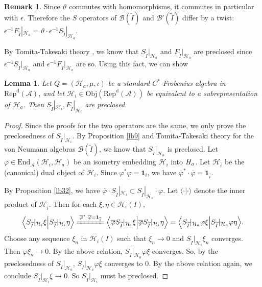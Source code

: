 \documentclass[12pt,a4paper]{article}
\theoremstyle{definition}
\newtheorem{rem}[df]{Remark}
\theoremstyle{plain}
\newtheorem{lm}[df]{Lemma}
\newcommand{\mc}{\mathcal}
\newcommand{\wtd}{\widetilde}
\newcommand{\ovl}{\overline}
\newcommand{\End}{\mathrm{End}} %
\newcommand{\id}{\mathbf{1}}
\newcommand{\bk}[1]{\langle {#1}\rangle}
\newcommand{\RepdA}{\mathrm{Rep}^{\mathrm d}(\mc A)}
\newcommand{\Obj}{\mathrm{Obj}}
\numberwithin{equation}{section}
\begin{document}
\begin{rem}\label{lb33}
Since $\vartheta$ commutes with homomorphisms, it commutes in particular with $\epsilon$. Therefore the $S$ operators of $\mc B(\wtd I)$ and $\mc B'(\wtd I)$ differ by a twist: $\epsilon^{-1}F_{\wtd I}|_{\mc H_a}=\vartheta\cdot\epsilon^{-1}S_{\wtd I}|_{\mc H_a}$.
\end{rem}

By Tomita-Takesaki theory \cite[Chapter VI]{Tak02}, we know that $S_{\wtd I}|_{\mc H_a}$ and $F_{\wtd I}|_{\mc H_a}$ are preclosed since $\epsilon^{-1} S_{\wtd I}|_{\mc H_a}$ and $\epsilon ^{-1}F_{\wtd I}|_{\mc H_a}$ are so. Using this fact, we can show
\begin{lm}
Let $Q=(\mc H_a,\mu,\iota)$ be a standard $C^*$-Frobenius algebra in $\RepdA$, and let $\mc H_i\in\Obj(\RepdA)$ be equivalent to a subrepresentation of $\mc H_a$.  Then $S_{\wtd I}|_{\mc H_i}, F_{\wtd I}|_{\mc H_i}$ are preclosed. 
\end{lm}

\begin{proof}
Since the proofs for the two operators are the same, we only prove the preclosedness of $S_{\wtd I}|_{\mc H_i}$. By Proposition \ref{lb9} and Tomita-Takesaki theory for the von Neumann algebras $\mc B(\wtd I)$, we know that $S_{\wtd I}|_{\mc H_a}$ is preclosed. Let $\varphi\in\End_{\mc A}(\mc H_i,\mc H_a)$ be an isometry embedding $\mc H_i$ into $\mc \mc H_a$. Let $\mc H_{\ovl i}$ be the (canonical) dual object of $\mc H_i$.  Since $\varphi^*\varphi=\id_i$, we have $\ovl\varphi^*\cdot \ovl\varphi=\id_{\ovl i}$.

By Proposition \ref{lb32}, we have $\ovl \varphi\cdot S_{\wtd I}|_{\mc H_i}\subset S_{\wtd I}|_{\mc H_a}\cdot \varphi$. Let $\bk{\cdot|\cdot}$ denote the inner product of $\mc H_{\ovl i}$. Then for each $\xi,\eta\in\mc H_i(I)$,
\begin{align*}
\Big\langle S_{\wtd I}|_{\mc H_i}\xi\Big|S_{\wtd I}|_{\mc H_i}\eta\Big\rangle\xlongequal{\ovl\varphi^*\cdot \ovl\varphi=\id_{\ovl i}}\Big\langle \ovl\varphi S_{\wtd I}|_{\mc H_i}\xi\Big|\ovl\varphi S_{\wtd I}|_{\mc H_i}\eta\Big\rangle=\Big\langle S_{\wtd I}|_{\mc H_a}\varphi\xi\Big|S_{\wtd I}|_{\mc H_a}\varphi\eta\Big\rangle.
\end{align*}
Choose any sequence $\xi_n$ in $\mc H_i(I)$ such that $\xi_n\rightarrow 0$ and $S_{\wtd I}|_{\mc H_i}\xi_n$ converges. Then $\varphi\xi_n\rightarrow 0$.  By the above relation, $S_{\wtd I}|_{\mc H_a}\varphi\xi$ converges. So, by the preclosedness of $S_{\wtd I}|_{\mc H_a}$, $S_{\wtd I}|_{\mc H_a}\varphi\xi$ converges to $0$. By the above relation again, we conclude $S_{\wtd I}|_{\mc H_i}\xi\rightarrow 0$. So $S_{\wtd I}|_{\mc H_i}$ must be preclosed.
\end{proof}
\end{document}
